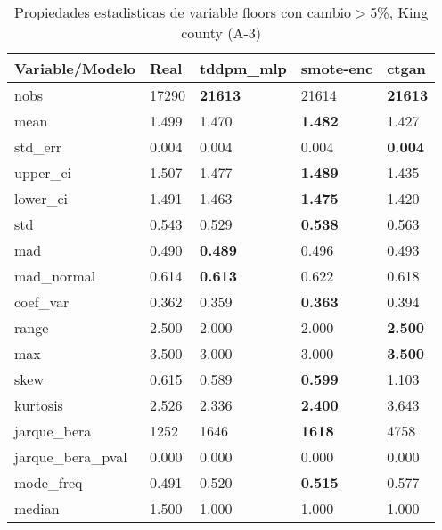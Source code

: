 \begin{table}[H]
\centering
\fontsize{8}{14}\selectfont
\caption{Propiedades estadisticas de variable floors con cambio\ensuremath{>}5\%, King county (A-3)}
\label{table-stats-king county-a-3-floors-short}
\begin{tabular}{|l|m{10em}|m{10em}|m{10em}|m{10em}|}
\hline
 \rowcolor[gray]{0.8}
Variable/Modelo & Real & tddpm\_mlp & smote-enc & ctgan \\
\hline nobs & 17290 & \bfseries 21613 & \cellcolor[rgb]{0.9, 0.54, 0.52} 21614 & \bfseries 21613 \\
\hline mean & 1.499 & 1.470 & \bfseries 1.482 & \cellcolor[rgb]{0.9, 0.54, 0.52} 1.427 \\
\hline std\_err & 0.004 & \cellcolor[rgb]{0.9, 0.54, 0.52} 0.004 & 0.004 & \bfseries 0.004 \\
\hline upper\_ci & 1.507 & 1.477 & \bfseries 1.489 & \cellcolor[rgb]{0.9, 0.54, 0.52} 1.435 \\
\hline lower\_ci & 1.491 & 1.463 & \bfseries 1.475 & \cellcolor[rgb]{0.9, 0.54, 0.52} 1.420 \\
\hline std & 0.543 & 0.529 & \bfseries 0.538 & \cellcolor[rgb]{0.9, 0.54, 0.52} 0.563 \\
\hline mad & 0.490 & \bfseries 0.489 & \cellcolor[rgb]{0.9, 0.54, 0.52} 0.496 & 0.493 \\
\hline mad\_normal & 0.614 & \bfseries 0.613 & \cellcolor[rgb]{0.9, 0.54, 0.52} 0.622 & 0.618 \\
\hline coef\_var & 0.362 & 0.359 & \bfseries 0.363 & \cellcolor[rgb]{0.9, 0.54, 0.52} 0.394 \\
\hline range & 2.500 & \cellcolor[rgb]{0.9, 0.54, 0.52} 2.000 & \cellcolor[rgb]{0.9, 0.54, 0.52} 2.000 & \bfseries 2.500 \\
\hline max & 3.500 & \cellcolor[rgb]{0.9, 0.54, 0.52} 3.000 & \cellcolor[rgb]{0.9, 0.54, 0.52} 3.000 & \bfseries 3.500 \\
\hline skew & 0.615 & 0.589 & \bfseries 0.599 & \cellcolor[rgb]{0.9, 0.54, 0.52} 1.103 \\
\hline kurtosis & 2.526 & 2.336 & \bfseries 2.400 & \cellcolor[rgb]{0.9, 0.54, 0.52} 3.643 \\
\hline jarque\_bera & 1252 & 1646 & \bfseries 1618 & \cellcolor[rgb]{0.9, 0.54, 0.52} 4758 \\
\hline jarque\_bera\_pval & 0.000 & 0.000 & 0.000 & 0.000 \\
\hline mode\_freq & 0.491 & 0.520 & \bfseries 0.515 & \cellcolor[rgb]{0.9, 0.54, 0.52} 0.577 \\
\hline median & 1.500 & 1.000 & 1.000 & 1.000 \\
\hline
\end{tabular}
\end{table}
